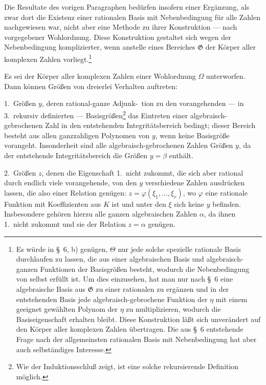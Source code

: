 \documentclass[12pt,a4paper]{article}
\begin{document}
Die Resultate des vorigen Paragraphen bed\"urfen insofern einer Erg\"anzung, als zwar dort die Existenz einer rationalen Basis mit Nebenbedingung f\"ur alle Zahlen nachgewiesen war, nicht aber eine Methode zu ihrer Konstruktion --- nach vorgegebener Wohlordnung. Diese Konstruktion gestaltet sich wegen der Nebenbedingung komplizierter, wenn anstelle eines Bereiches $\mathfrak{G}$ der K\"orper aller komplexen Zahlen vorliegt.\footnote{Es w\"urde in \S\ 6, b) gen\"ugen, $\Theta$ nur jede solche spezielle rationale Basis durchlaufen zu lassen, die aus einer algebraischen Basis und algebraisch-ganzen Funktionen der Basisgr\"o\ss en besteht, wodurch die Nebenbedingung von selbst erf\"ullt ist. Um dies einzusehen, hat man nur nach \S\ 6 eine algebraische Basis aus $\mathfrak{G}$ zu einer rationalen zu erg\"anzen und in der entstehenden Basis jede algebraisch-gebrochene Funktion der $\eta$ mit einem geeignet gew\"ahlten Polynom der $\eta$ zu multiplizieren, wodurch die Basiseigenschaft erhalten bleibt. Diese Konstruktion l\"a\ss t sich unver\"andert auf den K\"orper aller komplexen Zahlen \"ubertragen. Die aus \S\ 6 entstehende Frage nach der allgemeinsten rationalen Basis mit Nebenbedingung hat aber auch selbst\"andiges Interesse.}

Es sei der K\"orper aller komplexen Zahlen einer Wohlordnung $\Omega$ unterworfen. Dann k\"onnen Gr\"o\ss en von dreierlei Verhalten auftreten:

1.\ Gr\"o\ss en $y$, deren rational-ganze Adjunk-\ tion zu den vorangehenden --- in 3.\ rekursiv definierten --- Basisgr\"o\ss en\footnote{Wie der Induktionsschlu\ss{} zeigt, ist eine solche rekursierende Definition m\"oglich.} das Eintreten einer algebraisch-gebrochenen Zahl in den entstehenden Integrit\"atsbereich bedingt; dieser Bereich besteht aus allen ganzzahligen Polynomen von $y$, wenn keine Basisgr\"o\ss e vorangeht. Insonderheit sind alle algebraisch-gebrochenen Zahlen Gr\"o\ss en $y$, da der entstehende Integrit\"atsbereich die Gr\"o\ss en $y = \beta$ enth\"alt.

2.\ Gr\"o\ss en $z$, denen die Eigenschaft 1.\ nicht zukommt, die sich aber rational durch endlich viele vorangehende, von den $y$ verschiedene Zahlen ausdr\"ucken lassen, die also einer Relation gen\"ugen: $z = \varphi(\xi_1, \ldots, \xi_r)$, wo $\varphi$ eine rationale Funktion mit Koeffizienten aus $K$ ist und unter den $\xi$ sich keine $y$ befinden. Insbesondere geh\"oren hierzu alle ganzen algebraischen Zahlen $\alpha$, da ihnen 1.\ nicht zukommt und sie der Relation $z = \alpha$ gen\"ugen.
\end{document}
